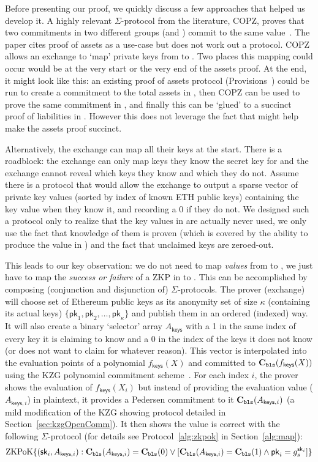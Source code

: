 Before presenting our \bootstrap proof, we quickly discuss a few approaches that helped us develop it. A highly relevant $\Sigma$-protocol from the literature, COPZ, proves that two commitments in two different groups (\eg \secp and \bls) commit to the same value~\cite{chase22}. The paper cites proof of assets as a use-case but does not work out a protocol. COPZ allows an exchange to `map' private keys from \secp to \bls. Two places this mapping could occur would be at the very start or the very end of the assets proof. At the end, it might look like this: an existing proof of assets protocol (\eg Provisions~\cite{provisions}) could be run to create a commitment to the total assets in \secp, then COPZ can be used to prove the same commitment in \bls, and finally this can be `glued' to a succinct proof of liabilities in \bls. However this does not leverage the fact that \bls might help make the assets proof succinct.

Alternatively, the exchange can map all their keys at the start. There is a roadblock: the exchange can only map keys they know the secret key for and the exchange cannot reveal which keys they know and which they do not. Assume there is a protocol that would allow the exchange to output a sparse vector of \bls private key values (sorted by index of known ETH public keys) containing the key value when they know it, and recording a 0 if they do not. We designed such a protocol only to realize that the key values in \bls are actually never used, we only use the fact that knowledge of them is proven (which is covered by the ability to produce the value in \bls) and the fact that unclaimed keys are zeroed-out. 

This leads to our key observation: we do not need to map \textit{values} from \secp to \bls, we just have to map the \textit{success or failure} of a ZKP in \secp to \bls. This can be accomplished by composing (conjunction and disjunction of) $\Sigma$-protocols. The prover (exchange) will choose set of Ethereum public keys as its anonymity set of size $\kappa$ (containing its actual keys) $\{\mathsf{pk}_1,\mathsf{pk}_2,\dots,\mathsf{pk}_\kappa\}$ and publish them in an ordered (indexed) way. It will also create a binary `selector' array $A_\mathsf{keys}$ with a 1 in the same index of every key it is claiming to know and a 0 in the index of the keys it does not know (or does not want to claim for whatever reason). This vector is interpolated into the evaluation points of a polynomial $f_\mathsf{keys}(X)$  and committed to $\textbf{C}_\texttt{bls}(f_\mathsf{keys}(X))$ using the KZG polynomial commitment scheme~\cite{kzg}. For each index $i$, the prover shows the evaluation of $f_\mathsf{keys}(X_i)$ but instead of providing the evaluation value ($A_{\mathsf{keys},i}$) in plaintext, it provides a Pedersen commitment to it $\textbf{C}_\texttt{bls}(A_{\mathsf{keys},i})$ (a mild modification of the KZG showing protocol detailed in Section~\ref{sec:kzgOpenComm}). It then shows the value is correct with the following $\Sigma$-protocol (for details see Protocol~\ref{alg:zkpok} in Section~\ref{alg:map}):
\[ \mathrm{ZKPoK} \{ (\mathsf{sk}_i,A_{\mathsf{keys},i}) : \textbf{C}_\texttt{bls}(A_{\mathsf{keys},i})=\textbf{C}_\texttt{bls}(0) \lor [\textbf{C}_\texttt{bls}(A_{\mathsf{keys},i})=\textbf{C}_\texttt{bls}(1) \land \mathsf{pk}_i=g_s^{\mathsf{sk}_i} ] \} \]

